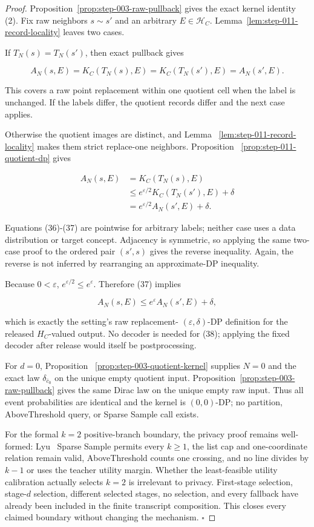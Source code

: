 \begin{proof}
Proposition~\ref{prop:step-003-raw-pullback} gives the
exact kernel identity (2). Fix raw neighbors \(s\sim s'\) and an arbitrary
\(E\in\mathcal H_C\). Lemma~\ref{lem:step-011-record-locality} leaves two
cases.

If \(T_N(s)=T_N(s')\), then exact pullback gives

\[
 A_N(s,E)=K_C(T_N(s),E)
         =K_C(T_N(s'),E)=A_N(s',E).
\tag{36}
\]

This covers a raw point replacement within one quotient cell when the
label is unchanged. If the labels differ, the quotient records differ and
the next case applies.

Otherwise the quotient images are distinct, and Lemma
~\ref{lem:step-011-record-locality} makes them strict replace-one neighbors.
Proposition
~\ref{prop:step-011-quotient-dp} gives

\[
\begin{aligned}
 A_N(s,E)
 &=K_C(T_N(s),E)\\
 &\leq e^{\varepsilon/2}K_C(T_N(s'),E)+\delta\\
 &=e^{\varepsilon/2}A_N(s',E)+\delta.
\end{aligned}
\tag{37}
\]

Equations (36)-(37) are pointwise for arbitrary labels; neither case uses a
data distribution or target concept. Adjacency is symmetric, so applying
the same two-case proof to the ordered pair \((s',s)\) gives the reverse
inequality. Again, the reverse is not inferred by rearranging an
approximate-DP inequality.

Because \(0<\varepsilon\),
\(e^{\varepsilon/2}\leq e^\varepsilon\). Therefore (37) implies

\[
 A_N(s,E)\leq e^\varepsilon A_N(s',E)+\delta,
\tag{38}
\]

which is exactly the setting's raw replacement-
\((\varepsilon,\delta)\)-DP definition for the released \(H_C\)-valued
output. No decoder is needed for (38); applying the fixed decoder after
release would itself be postprocessing.

For \(d=0\), Proposition
~\ref{prop:step-003-quotient-kernel} supplies \(N=0\) and the exact law
\(\delta_{\bar c_0}\) on the unique empty quotient input. Proposition~\ref{prop:step-003-raw-pullback} gives the same Dirac law on the
unique empty raw input. Thus all event probabilities are identical and the
kernel is \((0,0)\)-DP; no partition, AboveThreshold query, or Sparse Sample
call exists.

For the formal \(k=2\) positive-branch boundary, the privacy proof remains
well-formed: Lyu~\citep{lyu2025} Sparse Sample permits every \(k\geq1\), the list cap and
one-coordinate relation remain valid, AboveThreshold counts one crossing,
and no line divides by \(k-1\) or uses the teacher utility margin. Whether
the  least-feasible utility calibration actually selects \(k=2\)
is irrelevant to privacy. First-stage selection, stage-\(d\) selection,
different selected stages, no selection, and every fallback have already
been included in the finite transcript composition. This closes every
claimed boundary without changing the mechanism. \(\square\)


\end{proof}

